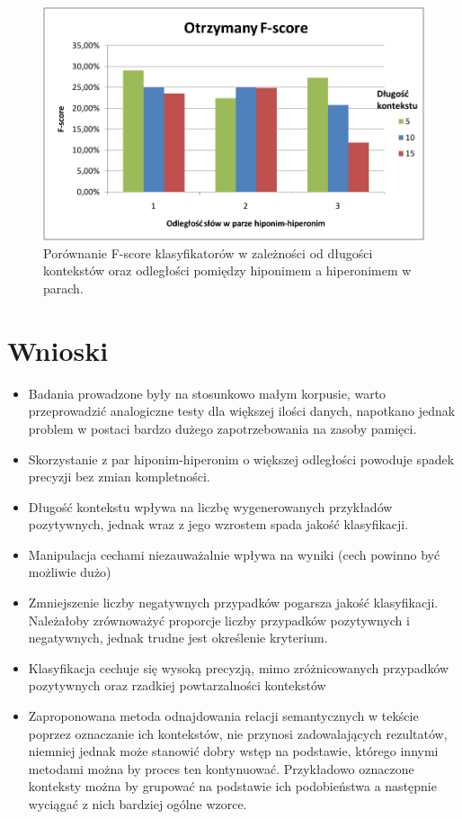 \documentclass[a4paper,10pt]{report}
\begin{document}
\begin{figure}[h]
\centering
 \includegraphics[width=13cm]{img/image001.png}
 \caption{Porównanie F-score klasyfikatorów w zależności od długości kontekstów oraz odległości pomiędzy hiponimem a hiperonimem w parach.}
\label{fig:wykres}
\end{figure} 

\section{Wnioski}


\begin{itemize}
\item Badania prowadzone były na stosunkowo małym korpusie, warto przeprowadzić analogiczne testy dla większej ilości danych,
napotkano jednak problem w postaci bardzo dużego zapotrzebowania na zasoby pamięci.  

\item Skorzystanie z par hiponim-hiperonim o większej odległości powoduje spadek precyzji bez zmian kompletności.

\item Długość kontekstu wpływa na liczbę wygenerowanych przykładów pozytywnych, jednak wraz z jego wzrostem spada jakość klasyfikacji.

\item Manipulacja cechami niezauważalnie wpływa na wyniki (cech powinno być możliwie dużo)

\item Zmniejszenie liczby negatywnych przypadków pogarsza jakość klasyfikacji. Należałoby zrównoważyć proporcje liczby przypadków pozytywnych i negatywnych, jednak trudne jest określenie kryterium.

\item Klasyfikacja cechuje się wysoką precyzją, mimo zróżnicowanych przypadków pozytywnych oraz rzadkiej powtarzalności kontekstów

\item Zaproponowana metoda odnajdowania relacji semantycznych w tekście poprzez oznaczanie ich kontekstów, nie przynosi zadowalających rezultatów, niemniej jednak może stanowić dobry wstęp na podstawie, którego innymi metodami można by proces ten kontynuować. Przykładowo oznaczone konteksty można by grupować na podstawie ich podobieństwa a następnie wyciągać z nich bardziej ogólne wzorce.

\end{itemize}


\nocite{*}

\end{document}
